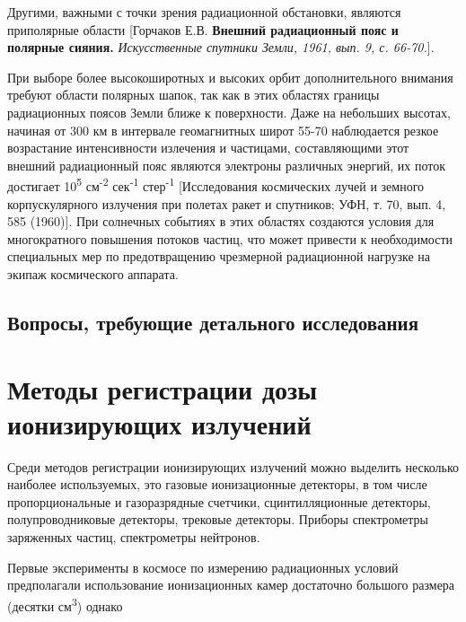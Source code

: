 Другими, важными с точки зрения радиационной обстановки, являются приполярные области [Горчаков Е.В. \textbf{Внешний радиационный пояс и полярные сияния. }\emph{Искусственные спутники Земли, 1961, вып. 9, с. 66-70.}].

При выборе более высокоширотных и высоких орбит дополнительного внимания требуют области полярных шапок, так как в этих областях границы радиационных поясов Земли ближе к поверхности. Даже на небольших высотах, начиная от 300 км в интервале геомагнитных широт 55-70 наблюдается резкое возрастание интенсивности излечения и частицами, составляющими этот внешний радиационный пояс являются электроны различных энергий, их поток достигает 10\textsuperscript{5} см\textsuperscript{-2} сек\textsuperscript{-1} стер\textsuperscript{-1} [Исследования космических лучей и земного корпускулярного излучения при полетах ракет и спутников; УФН, т. 70, вып. 4, 585 (1960)]. При солнечных событиях в этих областях создаются условия для многократного повышения потоков частиц, что может привести к необходимости специальных мер по предотвращению чрезмерной радиационной нагрузке на экипаж космического аппарата.
\subsection{Вопросы, требующие детального исследования}


\section{Методы регистрации дозы ионизирующих излучений} \label{sect1_2}

Среди методов регистрации ионизирующих излучений можно выделить несколько наиболее используемых, это газовые ионизационные детекторы, в том числе пропорциональные и газоразрядные счетчики, сцинтилляционные детекторы, полупроводниковые детекторы, трековые детекторы. Приборы спектрометры заряженных частиц, спектрометры нейтронов.


Первые эксперименты в космосе по измерению радиационных условий предполагали использование ионизационных камер достаточно большого размера (десятки см\textsuperscript{3}) однако 










